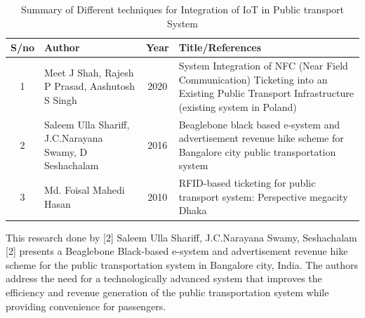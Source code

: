 \documentclass[conference]{IEEEtran}
\begin{document}
\begin{table}[ht]
\centering
\caption{Summary of Different techniques for Integration of
IoT in Public transport System}
\begin{tabular}{|c|p{2.5cm}|c|p{3cm}|}
\hline
\textbf{S/no} & \textbf{Author} & \textbf{Year} & \textbf{Title/References} \\
\hline
1 & Meet J Shah, Rajesh P Prasad, Aashutosh S Singh & 2020 & System Integration of NFC (Near Field Communication) Ticketing into an Existing Public Transport Infrastructure (existing system in Poland) \\
\hline
2 & Saleem Ulla Shariff, J.C.Narayana Swamy, D Seshachalam & 2016 & Beaglebone black based e-system and advertisement revenue hike scheme for Bangalore city public transportation system \\
\hline
3 & Md. Foisal Mahedi Hasan & 2010 & RFID-based ticketing for public transport system: Perspective megacity Dhaka \\
\hline
\end{tabular}
\end{table}

This research done by [2]	Saleem Ulla Shariff, J.C.Narayana Swamy, Seshachalam [2] presents a Beaglebone Black-based e-system and advertisement revenue hike scheme for the public transportation system in Bangalore city, India. The authors address the need for a technologically advanced system that improves the efficiency and revenue generation of the public transportation system while providing convenience for passengers.
\end{document}

